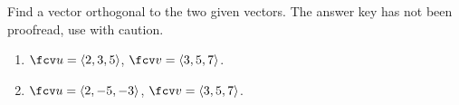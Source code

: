 Find a vector orthogonal to the two given vectors. The answer key has not been proofread, use with caution.

\begin{enumerate}
\item $\fcv u=\langle 2,3,5\rangle$, $\fcv v=\langle 3,5,7 \rangle$.
\item $\fcv u=\langle 2,-5,-3\rangle$, $\fcv v=\langle 3,5,7 \rangle$.

\end{enumerate}
